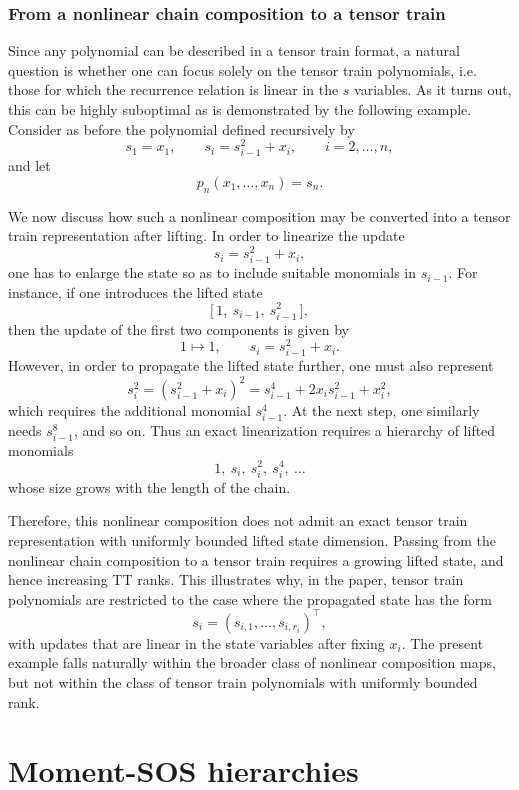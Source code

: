 \documentclass[11pt,a4paper]{article}
\theoremstyle{definition}
\begin{document}
\subsubsection{From a nonlinear chain composition to a tensor train}

Since any polynomial can be described in a tensor train format, a natural question is whether one can focus solely on the  tensor train polynomials, i.e. those for which the recurrence relation is linear in the $s$ variables. As it turns out, this can be highly suboptimal as is demonstrated by the following example. Consider as before the polynomial defined recursively by
\[
s_1=x_1,
\qquad
s_i=s_{i-1}^2+x_i,
\qquad i=2,\dots,n,
\]
and let
\[
p_n(x_1,\dots,x_n)=s_n.
\]

We now discuss how such a nonlinear composition may be converted into a tensor train representation after lifting. In order to linearize the update
\[
s_i=s_{i-1}^2+x_i,
\]
one has to enlarge the state so as to include suitable monomials in \(s_{i-1}\). For instance, if one introduces the lifted state
\[
\bigl[\,1,\ s_{i-1},\ s_{i-1}^2\,\bigr],
\]
then the update of the first two components is given by 
\[
1 \mapsto 1,
\qquad
s_i=s_{i-1}^2+x_i.
\]
However, in order to propagate the lifted state further, one must also represent
\[
s_i^2=(s_{i-1}^2+x_i)^2=s_{i-1}^4+2x_i s_{i-1}^2+x_i^2,
\]
which requires the additional monomial \(s_{i-1}^4\). At the next step, one similarly needs \(s_{i-1}^8\), and so on. Thus an exact linearization requires a hierarchy of lifted monomials
\[
1,\ s_i,\ s_i^2,\ s_i^4,\ \dots
\]
whose size grows with the length of the chain.

Therefore, this nonlinear composition does not admit an exact tensor train representation with uniformly bounded lifted state dimension. Passing from the nonlinear chain composition to a tensor train requires a growing lifted state, and hence increasing TT ranks. This illustrates why, in the paper, tensor train polynomials are restricted to the case where the propagated state has the form
\[
s_i=(s_{i,1},\dots,s_{i,r_i})^\top,
\]
with updates that are linear in the state variables after fixing \(x_i\). The present example falls naturally within the broader class of nonlinear composition maps, but not within the class of tensor train polynomials with uniformly bounded rank.



\section{Moment-SOS hierarchies}\label{sec:momsos}
\end{document}
